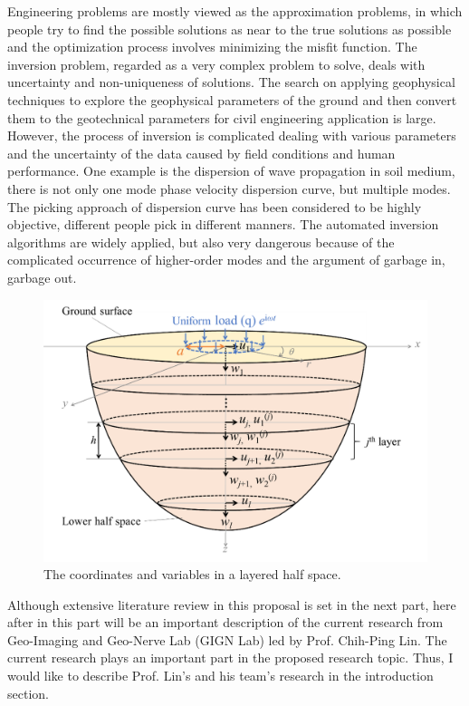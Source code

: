 Engineering problems are mostly viewed as the approximation problems, in which people try to find the possible solutions as near to the true solutions as possible and the optimization process involves minimizing the misfit function. The inversion problem, regarded as a very complex problem to solve, deals with uncertainty and non-uniqueness of solutions. The search on applying geophysical techniques to explore the geophysical parameters of the ground and then convert them to the geotechnical parameters for civil engineering application is large. However, the process of inversion is complicated dealing with various parameters and the uncertainty of the data caused by field conditions and human performance. One example is the dispersion of wave propagation in soil medium, there is not only one mode phase velocity dispersion curve, but multiple modes. The picking approach of dispersion curve has been considered to be highly objective, different people pick in different manners. The automated inversion algorithms are widely applied, but also very dangerous because of the complicated occurrence of higher-order modes and the argument of garbage in, garbage out.


\begin{figure}[h]
    \centering
    \includegraphics[scale=0.3]{images/earthmodel.png}
    \caption{The coordinates and variables in a layered half space.}
    \label{fig:earthmodel}
\end{figure}


Although extensive literature review in this proposal is set in the next part, here after in this part will be an important description of the current research from Geo-Imaging and Geo-Nerve Lab (GIGN Lab) led by Prof. Chih-Ping Lin. The current research plays an important part in the proposed research topic. Thus, I would like to describe Prof. Lin’s and his team's research in the introduction section.  

